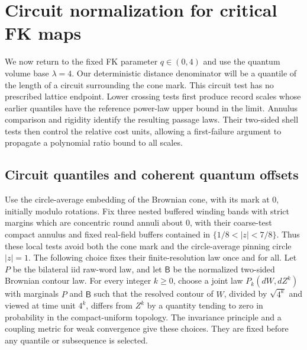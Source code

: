 \section{Circuit normalization for critical FK maps}
\label{comp:fk-normalization-section}

We now return to the fixed FK parameter $q\in(0,4)$ and use the
quantum volume base $\lambda=4$.  Our deterministic distance denominator
will be a quantile of the length of a circuit surrounding the cone mark.
This circuit test has no prescribed lattice endpoint.  Lower crossing
tests first produce record scales whose earlier quantiles have the
reference power-law upper bound in the limit.  Annulus comparison and
rigidity identify the resulting passage laws.  Their two-sided shell
tests then control the relative cost units, allowing a first-failure
argument to propagate a polynomial ratio bound to all scales.

\subsection{Circuit quantiles and coherent quantum offsets}

Use the circle-average embedding of the Brownian cone, with its mark
at $0$, initially modulo rotations.  Fix three nested buffered winding
bands with strict margins which are concentric round annuli about $0$,
with their coarse-test compact annulus and fixed real-field buffers
contained in $\{1/8<|z|<7/8\}$.  Thus these local tests avoid both
the cone mark and the circle-average pinning circle $|z|=1$.
The following choice
fixes their finite-resolution law once and for all.  Let $P$ be the
bilateral iid raw-word law, and let $\mathsf B$ be the normalized
two-sided Brownian contour law.  For every integer $k\ge0$, choose a
joint law $P_k(dW,dZ^k)$ with marginals $P$ and $\mathsf B$ such that
the resolved contour of $W$, divided by $\sqrt{4^k}$ and viewed at
time unit $4^k$, differs from $Z^k$ by a quantity tending to zero in
probability in the compact-uniform topology.  The invariance principle
and a coupling metric for weak convergence give these choices.  They
are fixed before any quantile or subsequence is selected.

